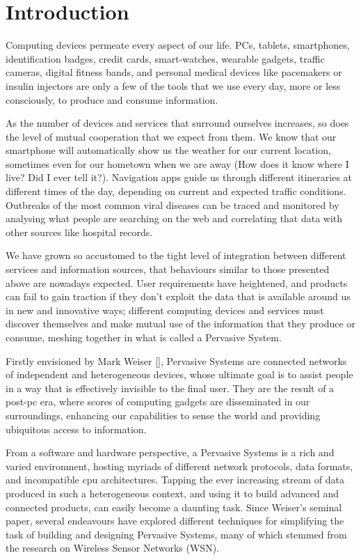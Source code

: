 \chapter{Introduction}

Computing devices permeate every aspect of our life. PCs, tablets, smartphones,
identification badges, credit cards, smart-watches, wearable gadgets, traffic
cameras, digital fitness bands, and personal medical devices like pacemakers or
insulin injectors are only a few of the tools that we use every day, more or
less consciously, to produce and consume information.

As the number of devices and services that surround ourselves increases, so
does the level of mutual cooperation that we expect from them. We know that our
smartphone will automatically show us the weather for our current location,
sometimes even for our hometown when we are away (How does it know where I
live? Did I ever tell it?). Navigation apps guide us through different
itineraries at different times of the day, depending on current and expected
traffic conditions. Outbreaks of the most common viral diseases can be traced
and monitored by analysing what people are searching on the web and correlating
that data with other sources like hospital records.

We have grown so accustomed to the tight level of integration between different
services and information sources, that behaviours similar to those presented
above are nowadays expected. User requirements have heightened, and products
can fail to gain traction if they don’t exploit the data that is available
around us in new and innovative ways; different computing devices and services
must discover themselves and make mutual use of the information that they
produce or consume, meshing together in what is called a Pervasive System.

Firstly envisioned by Mark Weiser [], Pervasive Systems are connected networks
of independent and heterogeneous devices, whose ultimate goal is to assist
people in a way that is effectively invisible to the final user. They are the
result of a post-pc era, where scores of computing gadgets are disseminated in
our surroundings, enhancing our capabilities to sense the world and providing
ubiquitous access to information.

From a software and hardware perspective, a Pervasive Systems is a rich and
varied environment, hosting myriads of different network protocols, data
formats, and incompatible cpu architectures. Tapping the ever increasing stream
of data produced in such a heterogeneous context, and using it to build
advanced and connected products, can easily become a daunting task. Since
Weiser’s seminal paper, several endeavours have explored different techniques
for simplifying the task of building and designing Pervasive Systems, many of
    which stemmed from the research on Wireless Sensor Networks (WSN).

